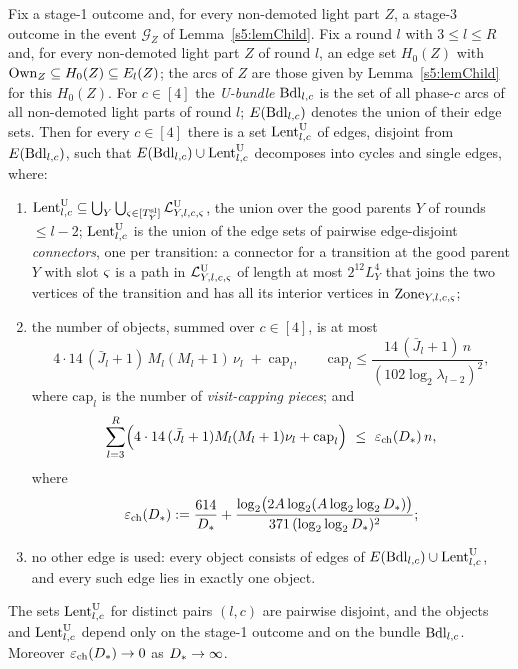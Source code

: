 \begin{lemma}\label{s5:lemParent}
Fix a stage-1 outcome and, for every non-demoted light part $Z$, a stage-3 outcome in the event $\mathcal G_Z$ of Lemma~\ref{s5:lemChild}. Fix a round $l$ with $3\le l\le R$ and, for every non-demoted light part $Z$ of round $l$, an edge set $H_0(Z)$ with $\mathrm{Own}_Z\subseteq H_0(Z)\subseteq E_l(Z)$; the arcs of $Z$ are those given by Lemma~\ref{s5:lemChild} for this $H_0(Z)$. For $c\in[4]$ the \emph{U-bundle} $\mathrm{Bdl}_{l,c}$ is the set of all phase-$c$ arcs of all non-demoted light parts of round $l$; $E(\mathrm{Bdl}_{l,c})$ denotes the union of their edge sets. Then for every $c\in[4]$ there is a set $\mathrm{Lent}^{\mathrm{U}}_{l,c}$ of edges, disjoint from $E(\mathrm{Bdl}_{l,c})$, such that $E(\mathrm{Bdl}_{l,c})\cup\mathrm{Lent}^{\mathrm{U}}_{l,c}$ decomposes into cycles and single edges, where:
\begin{enumerate}
\item[(i)] $\mathrm{Lent}^{\mathrm{U}}_{l,c}\subseteq\bigcup_Y\bigcup_{\varsigma\in[T^{\mathrm{sl}}_Y]}\mathcal{L}^{\mathrm{U}}_{Y,l,c,\varsigma}$, the union over the good parents $Y$ of rounds $\le l-2$; $\mathrm{Lent}^{\mathrm{U}}_{l,c}$ is the union of the edge sets of pairwise edge-disjoint \emph{connectors}, one per transition: a connector for a transition at the good parent $Y$ with slot $\varsigma$ is a path in $\mathcal{L}^{\mathrm{U}}_{Y,l,c,\varsigma}$ of length at most $2^{12}L_Y^4$ that joins the two vertices of the transition and has all its interior vertices in $\mathrm{Zone}_{Y,l,c,\varsigma}$;
\item[(ii)] the number of objects, summed over $c\in[4]$, is at most
\[
4\cdot14\,(\bar J_l+1)\,M_l(M_l+1)\,\nu_l\;+\;\mathrm{cap}_l,\qquad \mathrm{cap}_l\le\frac{14\,(\bar J_l+1)\,n}{(102\log_2\lambda_{l-2})^2},
\]
where $\mathrm{cap}_l$ is the number of \emph{visit-capping pieces}; and
\[
\sum_{l=3}^{R}\Bigl(4\cdot14\,(\bar J_l+1)M_l(M_l+1)\nu_l+\mathrm{cap}_l\Bigr)\ \le\ \epsChain(\Dstar)\,n,
\]
where
\[
\varepsilon_{\mathrm{ch}}(D_{*})\mathrel{:=}\frac{614}{D_{*}}+\frac{\log_2\bigl(2A\log_2(A\log_2\log_2D_{*})\bigr)}{371\,(\log_2\log_2D_{*})^2};
\]
\item[(iii)] no other edge is used: every object consists of edges of $E(\mathrm{Bdl}_{l,c})\cup\mathrm{Lent}^{\mathrm{U}}_{l,c}$, and every such edge lies in exactly one object.
\end{enumerate}
The sets $\mathrm{Lent}^{\mathrm{U}}_{l,c}$ for distinct pairs $(l,c)$ are pairwise disjoint, and the objects and $\mathrm{Lent}^{\mathrm{U}}_{l,c}$ depend only on the stage-1 outcome and on the bundle $\mathrm{Bdl}_{l,c}$. Moreover $\varepsilon_{\mathrm{ch}}(D_{*})\to0$ as $D_{*}\to\infty$.
\deps{\ref{s5:lemChild}, \ref{s5:defStages}, \ref{s5:lemZones}, \ref{s3:defCOL}, \ref{s3:lemCOLJV}, \ref{s3:lemMonotone}, \ref{s1:citEuler}, \ref{s2:propOV}, \ref{s2:lemTower}, \ref{s2:propStructure}, \ref{s1:condG1}, \ref{s1:citDef7}}
\end{lemma}

